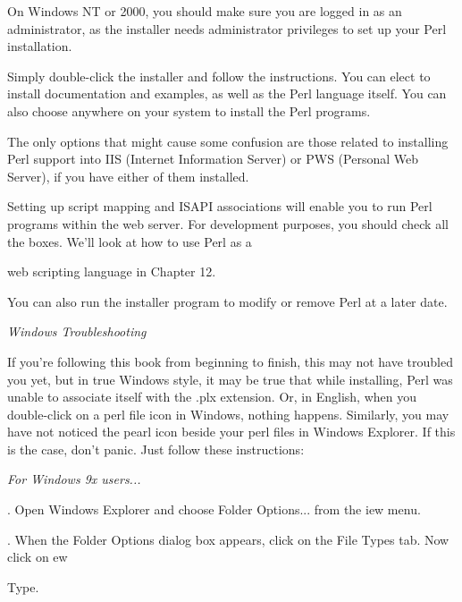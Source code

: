 \documentclass[a4paper,11pt]{book}
\begin{document}
\noindent On Windows NT or 2000, you should make sure you are logged in as an administrator, as the installer needs administrator privileges to set up your Perl installation.

\noindent 

\noindent Simply double-click the installer and follow the instructions. You can elect to install documentation and examples, as well as the Perl language itself. You can also choose anywhere on your system to install the Perl programs.

\noindent 

\noindent The only options that might cause some confusion are those related to installing Perl support into IIS (Internet Information Server) or PWS (Personal Web Server), if you have either of them installed.

\noindent Setting up script mapping and ISAPI associations will enable you to run Perl programs within the web server. For development purposes, you should check all the boxes. We'll look at how to use Perl as a

\noindent web scripting language in Chapter 12.

\noindent 

\noindent You can also run the installer program to modify or remove Perl at a later date.

\noindent 

\noindent 

\noindent \textit{Windows Troubleshooting}

\noindent If you're following this book from beginning to finish, this may not have troubled you yet, but in true Windows style, it may be true that while installing, Perl was unable to associate itself with the .plx extension. Or, in English, when you double-click on a perl file icon in Windows, nothing happens. Similarly, you may have not noticed the pearl icon beside your perl files in Windows Explorer. If this is the case, don't panic. Just follow these instructions:

\noindent 

\noindent \textit{For Windows 9x users...}

.   Open Windows Explorer and choose Folder Options... from the iew menu.

\noindent 

.   When the Folder Options dialog box appears, click on the File Types tab. Now click on ew

\noindent Type.
\end{document}
